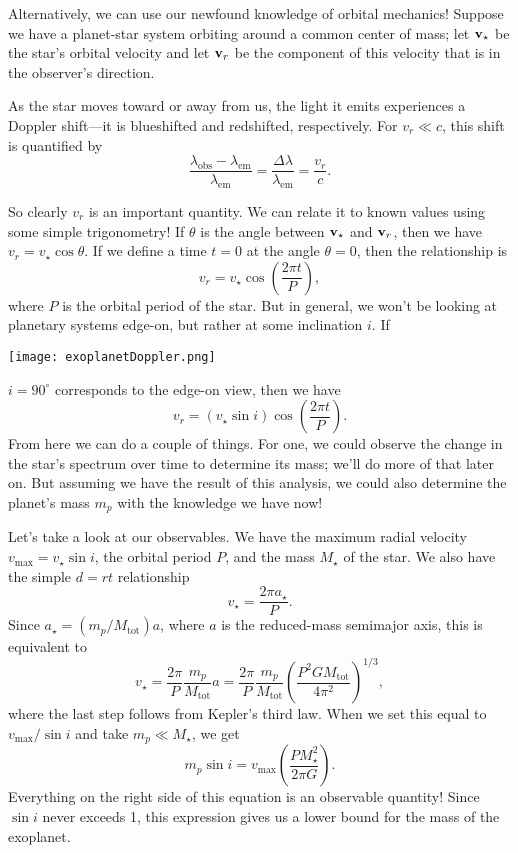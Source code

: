 \documentclass[../a062main.tex]{subfiles}
\begin{document}
Alternatively, we can use our newfound knowledge of orbital mechanics!
Suppose we have a planet-star system orbiting around a common center of mass; let $\mathbf{v}_\star$ be the star's orbital velocity and let $\mathbf{v}_r$ be the component of this velocity that is in the observer's direction.

As the star moves toward or away from us, the light it emits experiences a Doppler shift---it is blueshifted and redshifted, respectively.
For $v_r \ll c$, this shift is quantified by
\[ \frac{\lambda_\textrm{obs} - \lambda_\textrm{em}}{\lambda_\textrm{em}} = \frac{\Delta \lambda}{\lambda_\textrm{em}} = \frac{v_r}{c}. \]

\parbox{0.675\textwidth}{
    So clearly $v_r$ is an important quantity.
    We can relate it to known values using some simple trigonometry!
    If $\theta$ is the angle between $\mathbf{v}_\star$ and $\mathbf{v}_r$, then we have $v_r = v_\star \cos \theta$.
    If we define a time $t=0$ at the angle $\theta=0$, then the relationship is
    \[ v_r = v_\star \cos \left( \frac{2\pi t}{P} \right), \]
    where $P$ is the orbital period of the star.
    But in general, we won't be looking at planetary systems edge-on, but rather at some inclination $i$.
    If
}\parbox{0.375\textwidth}{
    \quad\;
    \texttt{[image: exoplanetDoppler.png]}
}

\vspace{-4pt}
$i=90^\circ$ corresponds to the edge-on view, then we have
\[ \boxed{v_r = (v_\star \sin i) \cos \left( \frac{2\pi t}{P} \right)}. \]
From here we can do a couple of things.
For one, we could observe the change in the star's spectrum over time to determine its mass; we'll do more of that later on.
But assuming we have the result of this analysis, we could also determine the planet's mass $m_p$ with the knowledge we have now!

Let's take a look at our observables.
We have the maximum radial velocity $v_\textrm{max} = v_\star \sin i$, the orbital period $P$, and the mass $M_\star$ of the star.
We also have the simple $d = rt$ relationship
\[ v_\star = \frac{2 \pi a_\star}{P}. \]
Since $a_\star = (m_p / M_\textrm{tot}) a$, where $a$ is the reduced-mass semimajor axis, this is equivalent to
\[ v_\star = \frac{2\pi}{P} \frac{m_p}{M_\textrm{tot}} a = \frac{2\pi}{P} \frac{m_p}{M_\textrm{tot}} \left( \frac{P^2 GM_\textrm{tot}}{4 \pi^2} \right)^{1/3}, \]
where the last step follows from Kepler's third law.
When we set this equal to $v_\textrm{max} / \sin i$ and take $m_p \ll M_\star$, we get
\[ \boxed{m_p \sin i = v_\textrm{max} \left( \frac{PM_\star^2}{2\pi G} \right)}. \]
Everything on the right side of this equation is an observable quantity!
Since $\sin i$ never exceeds 1, this expression gives us a lower bound for the mass of the exoplanet.
\end{document}
